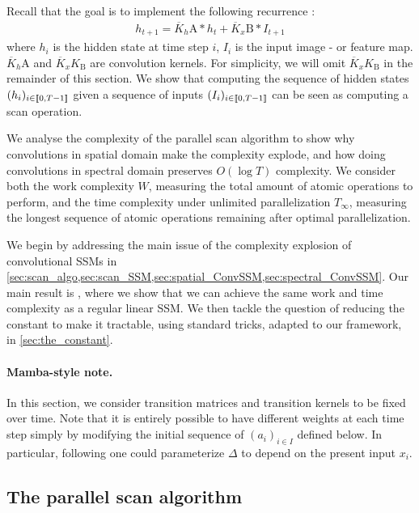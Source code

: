 
Recall that the goal is to implement the following recurrence :
\begin{align}
\label{eq:convssm_recurrence}
    h_{t+1}=\overline{K}_h{\mathrm{A}} \ast h_t + \overline{K}_x{\mathrm{B}}\ast I_{t+1}
\end{align}
where $h_i$ is the hidden state at time step $i$, $I_i$ is the input image - or feature map. $\overline{K}_h{\mathrm{A}}$ and $\overline{K}_xK_{\mathrm{B}}$ are convolution kernels. For simplicity, we will omit $\overline{K}_xK_{\mathrm{B}}$ in the remainder of this section. We show that computing the sequence of hidden states $(h_i)_{i\in\llbracket 0, T-1 \rrbracket}$ given a sequence of inputs $(I_i)_{i\in\llbracket 0, T-1 \rrbracket}$ can be seen as computing a scan operation.

We analyse the complexity of the parallel scan algorithm to show why convolutions in spatial domain make the complexity explode, and how doing convolutions in spectral domain preserves $O(\log T)$ complexity. We consider both the work complexity $W$, measuring the total amount of atomic operations to perform, and the time complexity under unlimited parallelization $T_\infty$, measuring the longest sequence of atomic operations remaining after optimal parallelization.

We begin by addressing the main issue of the complexity explosion of convolutional SSMs in \cref{sec:scan_algo,sec:scan_SSM,sec:spatial_ConvSSM,sec:spectral_ConvSSM}. Our main result is , where we show that we can achieve the same work and time complexity as a regular linear SSM. We then tackle the question of reducing the constant to make it tractable, using standard tricks, adapted to our framework, in \cref{sec:the_constant}.

\paragraph{Mamba-style note.} In this section, we consider transition matrices and transition kernels to be fixed over time. Note that it is entirely possible to have different weights at each time step simply by modifying the initial sequence of $(a_i)_{i\in I}$ defined below. In particular, following \citet{TODO:Mamba} one could parameterize $\Delta$ to depend on the present input $x_i$.

\subsection{The parallel scan algorithm}
\label{sec:scan_algo}

